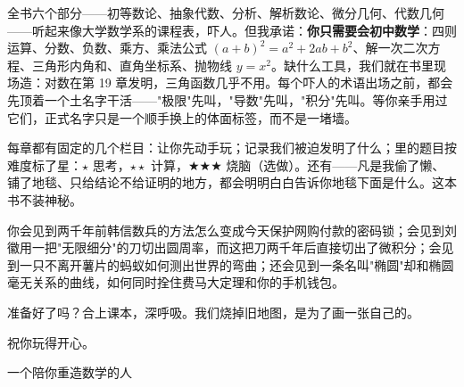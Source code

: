 全书六个部分——初等数论、抽象代数、分析、解析数论、微分几何、代数几何——听起来像大学数学系的课程表，吓人。但我承诺：\textbf{你只需要会初中数学}：四则运算、分数、负数、乘方、乘法公式 $(a+b)^2=a^2+2ab+b^2$、解一次二次方程、三角形内角和、直角坐标系、抛物线 $y=x^2$。缺什么工具，我们就在书里现场造：对数在第 19 章发明，三角函数几乎不用。每个吓人的术语出场之前，都会先顶着一个土名字干活——"极限"先叫，"导数"先叫，"积分"先叫。等你亲手用过它们，正式名字只是一个顺手换上的体面标签，而不是一堵墙。

每章都有固定的几个栏目：让你先动手玩；记录我们被迫发明了什么；里的题目按难度标了星：$\star$ 思考，$\star\star$ 计算，$\bigstar\bigstar\bigstar$ 烧脑（选做）。还有——凡是我偷了懒、铺了地毯、只给结论不给证明的地方，都会明明白白告诉你地毯下面是什么。这本书不装神秘。

你会见到两千年前韩信数兵的方法怎么变成今天保护网购付款的密码锁；会见到刘徽用一把"无限细分"的刀切出圆周率，而这把刀两千年后直接切出了微积分；会见到一只不离开薯片的蚂蚁如何测出世界的弯曲；还会见到一条名叫"椭圆"却和椭圆毫无关系的曲线，如何同时拴住费马大定理和你的手机钱包。

准备好了吗？合上课本，深呼吸。我们烧掉旧地图，是为了画一张自己的。

祝你玩得开心。

\hfill 一个陪你重造数学的人
